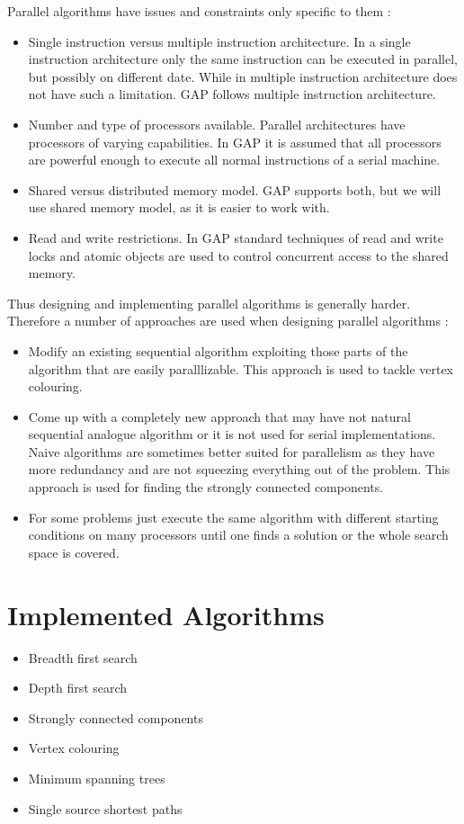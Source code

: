 \documentclass{report}
\theoremstyle{plain}
\theoremstyle{definition}
\theoremstyle{remark}
\numberwithin{definition}{chapter}
\numberwithin{example}{chapter}
\numberwithin{figure}{chapter}
\begin{document}
Parallel algorithms have issues and constraints only specific to them \cite{berman1996fundamentals}:

\begin{itemize}
  \item Single instruction versus multiple instruction architecture. In a single instruction architecture only the same instruction can be executed in parallel, but possibly on different date. While in multiple instruction architecture does not have such a limitation. GAP follows multiple instruction architecture.
  \item Number and type of processors available. Parallel architectures have processors of varying capabilities. In GAP it is assumed that all processors are powerful enough to execute all normal instructions of a serial machine.
  \item Shared versus distributed memory model. GAP supports both, but we will use shared memory model, as it is easier to work with.
  \item Read and write restrictions. In GAP standard techniques of read and write locks and atomic objects are used to control concurrent access to the shared memory.
\end{itemize}

Thus designing and implementing parallel algorithms is generally harder. Therefore a number of approaches are used when designing parallel algorithms \cite{berman1996fundamentals}:
\begin{itemize}
  \item Modify an existing sequential algorithm exploiting those parts of the algorithm that are easily paralllizable. This approach is used to tackle vertex colouring.
  \item Come up with a completely new approach that may have not natural sequential analogue algorithm or it is not used for serial implementations. Naive algorithms are sometimes better suited for parallelism as they have more redundancy and are not squeezing everything out of the problem. This approach is used for finding the strongly connected components.
  \item For some problems just execute the same algorithm with different starting conditions on many processors until one finds a solution or the whole search space is covered.
\end{itemize}

\section{Implemented Algorithms}
\begin{itemize}
  \item Breadth first search
  \item Depth first search
  \item Strongly connected components
  \item Vertex colouring
  \item Minimum spanning trees
  \item Single source shortest paths
\end{itemize}
\end{document}
